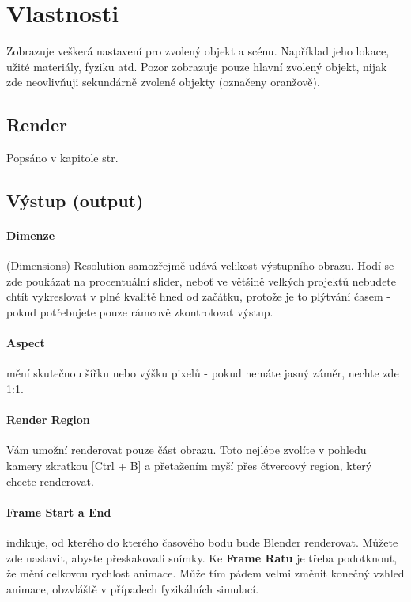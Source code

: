 \documentclass[12pt,a4paper]{report}
\begin{document}
	\section{Vlastnosti}
	
	Zobrazuje veškerá nastavení pro zvolený objekt a scénu. Například jeho
	lokace, užité materiály, fyziku atd. Pozor zobrazuje pouze hlavní zvolený
	objekt, nijak zde neovlivňuji sekundárně zvolené objekty (označeny
	oranžově).
	
	\subsection{Render}
	Popsáno v kapitole  str. \pageref{section:render}
	
	\subsection{Výstup (output)}
	\paragraph{Dimenze} (Dimensions) Resolution samozřejmě udává velikost
	výstupního obrazu. Hodí se zde poukázat na procentuální slider, neboť ve
	většině velkých projektů nebudete chtít vykreslovat v plné kvalitě hned od
	začátku, protože je to plýtvání časem - pokud potřebujete pouze rámcově
	zkontrolovat výstup.
	\paragraph{Aspect} mění skutečnou šířku nebo výšku pixelů - pokud nemáte jasný
	záměr, nechte zde 1:1.
	\paragraph{Render Region} Vám umožní renderovat pouze část obrazu. Toto
	nejlépe zvolíte v pohledu kamery zkratkou [Ctrl + B] a přetažením myší
	přes čtvercový region, který chcete renderovat.
	\paragraph{Frame Start a End} indikuje, od kterého do kterého časového bodu
	bude Blender renderovat. Můžete zde nastavit, abyste přeskakovali
	snímky.
	Ke \textbf{Frame Ratu} je třeba podotknout, že mění celkovou rychlost animace.
	Může tím pádem velmi změnit konečný vzhled animace, obzvláště
	v případech fyzikálních simulací.
\end{document}
